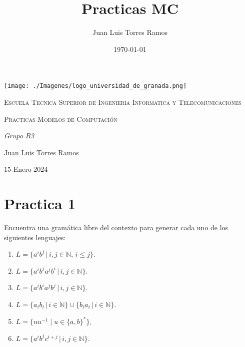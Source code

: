 \documentclass{article}
\title{Practicas MC}
\date{\today}
\author{Juan Luis Torres Ramos}
\begin{document}
        

        \begin{titlepage}
            \centering
            {\texttt{[image: ./Imagenes/logo\_universidad\_de\_granada.png]}\par}
            \vspace{1cm}
            {\scshape\Large Escuela Tecnica Superior de Ingenieria Informatica y Telecomunicaciones \par}
            \vspace{2.5cm}
            {\scshape\Huge Practicas Modelos de Computación \par}
            \vspace{1cm}
            {\itshape\Large  Grupo B3 \par} 
            \vfill
            {\Large Juan Luis Torres Ramos \par}
            \vspace{0.5cm}
            {\large 15 Enero 2024 \par}
            \end{titlepage}
        
        \newpage  
        \tableofcontents
        \newpage 




        \section{Practica 1}
        Encuentra una gramática libre del contexto para generar cada uno de los siguientes lenguajes:

        \begin{enumerate}
            \item $L = \{a^i b^j \, | \, i, j \in \mathbb{N}, \, i \leq j\}$.
            \item $L = \{a^i b^j a^j b^i \, | \, i, j \in \mathbb{N}\}$.
            \item $L = \{a^i b^i a^j b^j \, | \, i, j \in \mathbb{N}\}$.
            \item $L = \{a_i b_i \,|\, i \in \mathbb{N}\} \cup \{b_i a_i \,|\, i \in \mathbb{N\}}$.
            \item $L = \{uu^{-1} \mid u \in \{a, b\}^*\}$.
            \item $L = \{a^i b^j c^{i+j} \, | \, i, j \in \mathbb{N}\}$.    
        \end{enumerate}
\end{document}
